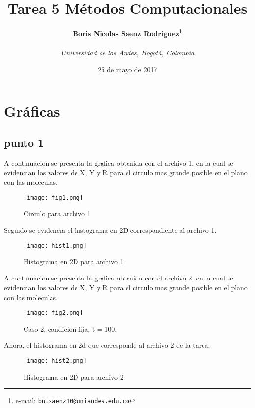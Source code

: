 ﻿\documentclass[notitlepage,letterpaper,12pt]{article}
\begin{document}
\title{Tarea 5 Métodos Computacionales}
\author{
\textbf{Boris Nicolas Saenz Rodriguez\thanks{e-mail: \texttt{bn.saenz10@uniandes.edu.co}}}\\
\date{25 de mayo de 2017}
\textit{Universidad de los Andes, Bogotá, Colombia}\\
} 

\maketitle 


\newpage
\section{Gráficas}

\subsection{punto 1}

A continuacion se presenta la grafica obtenida con el archivo  1, en la cual se evidencian los valores de X, Y y R para el circulo mas grande posible en el plano con las moleculas.


\begin{figure}[h!]
  \centering
   \texttt{[image: fig1.png]}
  \caption{Circulo para archivo 1 }
  \label{ini}
\end{figure}

\newpage

Seguido se evidencia el histograma en 2D correspondiente al archivo 1.

\begin{figure}[h!]
  \centering
   \texttt{[image: hist1.png]}
  \caption{Histograma en 2D para archivo 1}
  \label{c1t100c}
\end{figure}
\newpage


A continuacion se presenta la grafica obtenida con el archivo  2, en la cual se evidencian los valores de X, Y y R para el circulo mas grande posible en el plano con las moleculas.

\begin{figure}[h!]
  \centering
   \texttt{[image: fig2.png]}
  \caption{Caso 2, condicion fija, t = 100.}
  \label{fig: cobre}
\end{figure}
\newpage


Ahora, el histograma en 2d que corresponde al archivo 2 de la tarea.
\begin{figure}[h!]
  \centering
   \texttt{[image: hist2.png]}
  \caption{Histograma en 2D para archivo 2}
  \label{c1t100p}
\end{figure}
\newpage
\end{document}
